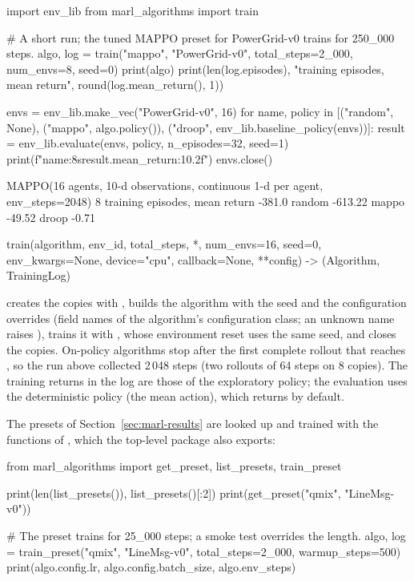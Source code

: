 \begin{pycode}
import env_lib
from marl_algorithms import train

# A short run; the tuned MAPPO preset for PowerGrid-v0 trains for 250_000 steps.
algo, log = train("mappo", "PowerGrid-v0", total_steps=2_000, num_envs=8,
                  seed=0)
print(algo)
print(len(log.episodes), "training episodes, mean return",
      round(log.mean_return(), 1))

envs = env_lib.make_vec("PowerGrid-v0", 16)
for name, policy in [("random", None), ("mappo", algo.policy()),
                     ("droop", env_lib.baseline_policy(envs))]:
    result = env_lib.evaluate(envs, policy, n_episodes=32, seed=1)
    print(f"{name:8s}{result.mean_return:10.2f}")
envs.close()
\end{pycode}

\begin{textcode}
MAPPO(16 agents, 10-d observations, continuous 1-d per agent, env_steps=2048)
8 training episodes, mean return -381.0
random     -613.22
mappo       -49.52
droop        -0.71
\end{textcode}

\begin{pycode}
train(algorithm, env_id, total_steps, *, num_envs=16, seed=0, env_kwargs=None,
      device="cpu", callback=None, **config) -> (Algorithm, TrainingLog)
\end{pycode}
creates the copies with , builds the algorithm with the
seed and the configuration overrides  (field names of the
algorithm's configuration class; an unknown name raises ),
trains it with , whose environment reset uses the same seed, and
closes the copies. On-policy algorithms stop after the first
complete rollout that reaches , so the run above collected
2\,048 steps (two rollouts of 64 steps on 8 copies). The training returns in
the log are those of the exploratory policy; the evaluation uses the
deterministic policy (the mean action), which  returns by
default.

The presets of Section~\ref{sec:marl-results} are looked up and trained with the
functions of , which the top-level package also
exports:

\begin{pycode}
from marl_algorithms import get_preset, list_presets, train_preset

print(len(list_presets()), list_presets()[:2])
print(get_preset("qmix", "LineMsg-v0"))

# The preset trains for 25_000 steps; a smoke test overrides the length.
algo, log = train_preset("qmix", "LineMsg-v0", total_steps=2_000,
                         warmup_steps=500)
print(algo.config.lr, algo.config.batch_size, algo.env_steps)
\end{pycode}

